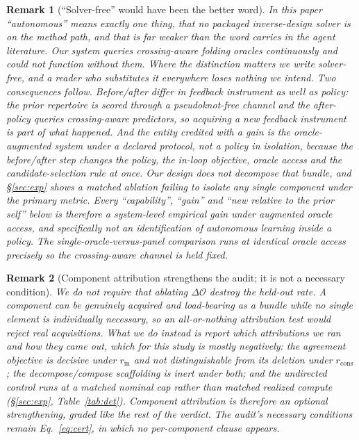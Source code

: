 \documentclass[11pt]{article}
\newtheorem{remark}{Remark}
\begin{document}
\begin{remark}[``Solver-free'' would have been the better word]\label{rem:autonomy}
In this paper ``autonomous'' means exactly one thing, that no packaged inverse-design solver is on the method
path, and that is far weaker than the word carries in the agent literature. Our system queries crossing-aware
folding oracles continuously and could not function without them. Where the distinction matters we write
\emph{solver-free}, and a reader who substitutes it everywhere loses nothing we intend. Two consequences follow.
Before/after differ in feedback instrument as well as policy: the prior repertoire is scored through a
pseudoknot-free channel and the after-policy queries crossing-aware predictors, so acquiring a new feedback
instrument is part of what happened. And the entity credited with a gain is the oracle-augmented system under a
declared protocol, not a policy in isolation, because the before/after step changes the policy, the in-loop
objective, oracle access and the candidate-selection rule at once. Our design does not decompose that bundle,
and \S\ref{sec:exp} shows a matched ablation failing to isolate any single component under the primary metric.
Every ``capability'', ``gain'' and ``new relative to the prior self'' below is therefore a system-level
empirical gain under augmented oracle access, and specifically not an identification of autonomous learning
inside a policy. The single-oracle-versus-panel comparison runs at identical oracle access precisely so the
crossing-aware channel is held fixed.
\end{remark}

\begin{remark}[Component attribution strengthens the audit; it is not a necessary condition]\label{rem:attrib}
We do not require that ablating $\Delta\mathcal O$ destroy the held-out rate. A component can be genuinely
acquired and load-bearing as a bundle while no single element is individually necessary, so an all-or-nothing
attribution test would reject real acquisitions. What we do instead is report which attributions we ran and how
they came out, which for this study is mostly negatively: the agreement objective is decisive under
$r_{\mathrm{in}}$ and not distinguishable from its deletion under $r_{\mathrm{cons}}$; the decompose/compose
scaffolding is inert under both; and the undirected control runs at a matched nominal cap rather than matched
realized compute (\S\ref{sec:exp}, Table~\ref{tab:det}). Component attribution is therefore an optional
strengthening, graded like the rest of the verdict. The audit's necessary conditions remain Eq.~\eqref{eq:cert},
in which no per-component clause appears.
\end{remark}
\end{document}
